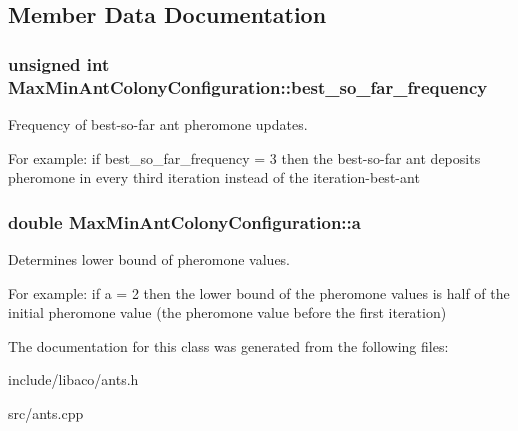 \subsection{Member Data Documentation}
\hypertarget{classMaxMinAntColonyConfiguration_4802ab01d7e73b5f31142679da63451a}{
\subsubsection[best\_\-so\_\-far\_\-frequency]{\setlength{\rightskip}{0pt plus 5cm}unsigned int {\bf MaxMinAntColonyConfiguration::best\_\-so\_\-far\_\-frequency}}}
\label{classMaxMinAntColonyConfiguration_4802ab01d7e73b5f31142679da63451a}


Frequency of best-so-far ant pheromone updates. 

For example: if best\_\-so\_\-far\_\-frequency = 3 then the best-so-far ant deposits pheromone in every third iteration instead of the iteration-best-ant \hypertarget{classMaxMinAntColonyConfiguration_ee28a7e4653e607c047b87f68ea73143}{
\subsubsection[a]{\setlength{\rightskip}{0pt plus 5cm}double {\bf MaxMinAntColonyConfiguration::a}}}
\label{classMaxMinAntColonyConfiguration_ee28a7e4653e607c047b87f68ea73143}


Determines lower bound of pheromone values. 

For example: if a = 2 then the lower bound of the pheromone values is half of the initial pheromone value (the pheromone value before the first iteration) 

The documentation for this class was generated from the following files:\begin{CompactItemize}
\item 
include/libaco/ants.h\item 
src/ants.cpp\end{CompactItemize}
